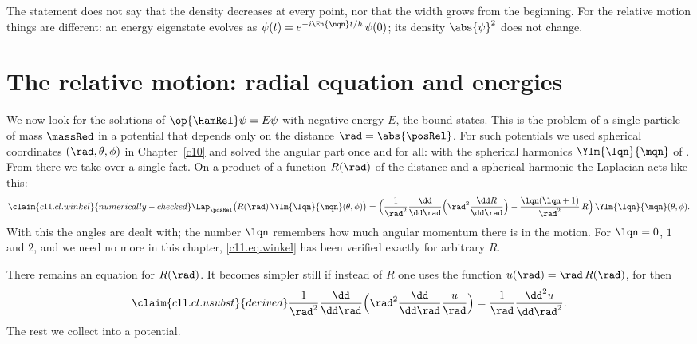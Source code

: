 \begin{vertiefung}
  The statement does not say that the density decreases at every point, nor that the
  width grows from the beginning. For the relative motion things are different: an
  energy eigenstate evolves as $\psi(t) = e^{-i\En{\nqn}t/\hbar}\,\psi(0)$; its density
  $\abs{\psi}^2$ does not change.
\end{vertiefung}


\section{The relative motion: radial equation and energies}\label{c11.s4}

We now look for the solutions of $\op{\HamRel}\psi = E\psi$ with negative energy $E$, the
bound states. This is the problem of a single particle of mass $\massRed$ in a potential
that depends only on the distance $\rad = \abs{\posRel}$. For such potentials we used
spherical coordinates $(\rad, \theta, \phi)$ in Chapter~\ref{c10} and solved the angular
part once and for all: with the spherical harmonics $\Ylm{\lqn}{\mqn}$ of .
From there we take over a single fact. On a product of a function $R(\rad)$ of the
distance and a spherical harmonic the Laplacian acts like this:
\begin{equation}\label{c11.eq.winkel}\claim{c11.cl.winkel}{numerically-checked}
  \Lap_{\posRel}\bigl(R(\rad)\,\Ylm{\lqn}{\mqn}(\theta, \phi)\bigr)
  = \Bigl(\frac{1}{\rad^2}\frac{\dd}{\dd\rad}\Bigl(\rad^2\frac{\dd R}{\dd\rad}\Bigr)
    - \frac{\lqn(\lqn + 1)}{\rad^2}\,R\Bigr)\,\Ylm{\lqn}{\mqn}(\theta, \phi).
\end{equation}
With this the angles are dealt with; the number $\lqn$ remembers how much angular
momentum there is in the motion. For $\lqn = 0$, $1$ and $2$, and we need no more in this
chapter, \eqref{c11.eq.winkel} has been verified exactly for arbitrary $R$.

There remains an equation for $R(\rad)$. It becomes simpler still if instead of $R$ one
uses the function $u(\rad) = \rad\,R(\rad)$, for then
\begin{equation}\label{c11.eq.usubst}\claim{c11.cl.usubst}{derived}
  \frac{1}{\rad^2}\frac{\dd}{\dd\rad}\Bigl(\rad^2\frac{\dd}{\dd\rad}\frac{u}{\rad}\Bigr)
  = \frac{1}{\rad}\frac{\dd^2 u}{\dd\rad^2} .
\end{equation}
The rest we collect into a potential.


